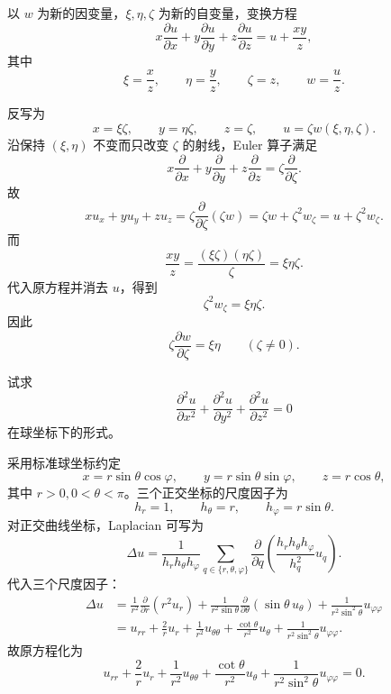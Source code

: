 \begin{xexercise}[6]
以 $w$ 为新的因变量，$\xi,\eta,\zeta$ 为新的自变量，变换方程
  \[
    x\frac{\partial u}{\partial x}+y\frac{\partial u}{\partial y}
    +z\frac{\partial u}{\partial z}=u+\frac{xy}{z},
  \]
  其中
  \[
    \xi=\frac xz,\qquad \eta=\frac yz,\qquad \zeta=z,\qquad w=\frac uz.
  \]
\end{xexercise}
\begin{xsolution}
反写为
\[
  x=\xi\zeta,
  \qquad y=\eta\zeta,
  \qquad z=\zeta,
  \qquad u=\zeta w(\xi,\eta,\zeta).
\]
沿保持 $(\xi,\eta)$ 不变而只改变 $\zeta$ 的射线，Euler 算子满足
\[
  x\frac\partial{\partial x}
  +y\frac\partial{\partial y}
  +z\frac\partial{\partial z}
  =\zeta\frac\partial{\partial\zeta}.
\]
故
\[
  xu_x+yu_y+zu_z
  =\zeta\frac\partial{\partial\zeta}(\zeta w)
  =\zeta w+\zeta^2w_\zeta
  =u+\zeta^2w_\zeta.
\]
而
\[
  \frac{xy}{z}=\frac{(\xi\zeta)(\eta\zeta)}\zeta
  =\xi\eta\zeta.
\]
代入原方程并消去 $u$，得到
\[
  \zeta^2w_\zeta=\xi\eta\zeta.
\]
因此
\[
  \boxed{\displaystyle
    \zeta\frac{\partial w}{\partial\zeta}=\xi\eta}
  \qquad(\zeta\ne0).
\]
\end{xsolution}


\begin{xexercise}[7]
试求
  \[
    \frac{\partial^2u}{\partial x^2}+\frac{\partial^2u}{\partial y^2}+\frac{\partial^2u}{\partial z^2}=0
  \]
  在球坐标下的形式。
\end{xexercise}
\begin{xsolution}
采用标准球坐标约定
\[
  x=r\sin\theta\cos\varphi,
  \qquad
  y=r\sin\theta\sin\varphi,
  \qquad
  z=r\cos\theta,
\]
其中 $r>0,0<\theta<\pi$。三个正交坐标的尺度因子为
\[
  h_r=1,
  \qquad h_\theta=r,
  \qquad h_\varphi=r\sin\theta.
\]
对正交曲线坐标，Laplacian 可写为
\[
  \Delta u
  =\frac1{h_rh_\theta h_\varphi}
   \sum_{q\in\{r,\theta,\varphi\}}
   \frac\partial{\partial q}
   \left(\frac{h_rh_\theta h_\varphi}{h_q^2}u_q\right).
\]
代入三个尺度因子：
\begin{align*}
  \Delta u
  &=\frac{1}{r^2}\frac\partial{\partial r}
      \left(r^2u_r\right)
    +\frac{1}{r^2\sin\theta}\frac\partial{\partial\theta}
      \left(\sin\theta\,u_\theta\right)
    +\frac{1}{r^2\sin^2\theta}u_{\varphi\varphi}\\
  &=u_{rr}+\frac2r u_r
    +\frac1{r^2}u_{\theta\theta}
    +\frac{\cot\theta}{r^2}u_\theta
    +\frac1{r^2\sin^2\theta}u_{\varphi\varphi}.
\end{align*}
故原方程化为
\[
  \boxed{\displaystyle
    u_{rr}+\frac2r u_r
    +\frac1{r^2}u_{\theta\theta}
    +\frac{\cot\theta}{r^2}u_\theta
    +\frac1{r^2\sin^2\theta}u_{\varphi\varphi}=0}.
\]
\end{xsolution}


